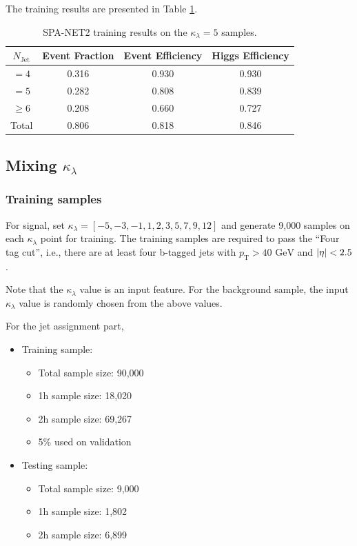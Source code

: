 \documentclass[12pt]{article}
\begin{document}
		The training results are presented in Table \ref{tab:SPANet2_diHiggs_4b_pt40_k5_class}.
		\begin{table}[htpb]
			\centering
			\caption{SPA-NET2 training results on the $\kappa_\lambda =5$ samples.}
			\label{tab:SPANet2_diHiggs_4b_pt40_k5_class}
			\begin{tabular}{c|c|cc}
				$N_\text{Jet}$ & Event Fraction & Event Efficiency & Higgs Efficiency \\
				\hline
				$=4$	  &   0.316             &    0.930              &    0.930             \\
				$=5$	  &   0.282             &    0.808              &    0.839             \\
				$\ge 6$	  &   0.208             &    0.660              &    0.727             \\
				Total	  &   0.806             &    0.818              &    0.846             \\
			\end{tabular}
		\end{table}	

	\subsection{Mixing \texorpdfstring{$\kappa_\lambda$}{kappa}}%
	\label{sub:mixing_kappa}
		\subsubsection{Training samples}%
		\label{subs:training_samples}
			For signal, set $\kappa_\lambda = [-5, -3, -1, 1, 2, 3, 5, 7, 9, 12]$ and generate 9,000 samples on each $\kappa_\lambda$ point for training. The training samples are required to pass the ``Four tag cut'', i.e., there are at least four b-tagged jets with $p_\text{T} > \text{40 GeV}$ and $\abs{\eta} < 2.5$. 

			Note that the $\kappa_\lambda$ value is an input feature. For the background sample, the input $\kappa_\lambda$ value is randomly chosen from the above values.

			For the jet assignment part,
			\begin{itemize}
				\item Training sample:
				\begin{itemize}
					\item Total sample size: 90,000
					\item 1h sample size: 18,020
					\item 2h sample size: 69,267
					\item 5\% used on validation
				\end{itemize}
				\item Testing sample:
				\begin{itemize}
					\item Total sample size: 9,000
					\item 1h sample size: 1,802
					\item 2h sample size: 6,899				
				\end{itemize}
			\end{itemize}
\end{document}
